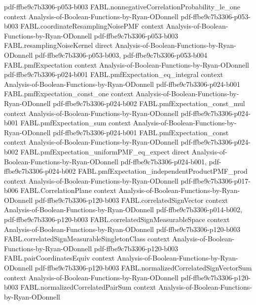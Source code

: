 \begin{theorem}
  {pdf-ffbe9c7b3306-p053-b003}
\proofstep
  {FABL.nonnegativeCorrelationProbability_le_one}
  {context}
  {Analysis-of-Boolean-Functions-by-Ryan-ODonnell}
  {pdf-ffbe9c7b3306-p053-b003}
\proofstep
  {FABL.coordinateResamplingNoisePMF}
  {context}
  {Analysis-of-Boolean-Functions-by-Ryan-ODonnell}
  {pdf-ffbe9c7b3306-p053-b003}
\proofstep
  {FABL.resamplingNoiseKernel}
  {direct}
  {Analysis-of-Boolean-Functions-by-Ryan-ODonnell}
  {pdf-ffbe9c7b3306-p053-b003,
    pdf-ffbe9c7b3306-p053-b004}
\proofstep
  {FABL.pmfExpectation}
  {context}
  {Analysis-of-Boolean-Functions-by-Ryan-ODonnell}
  {pdf-ffbe9c7b3306-p024-b001}
\proofstep
  {FABL.pmfExpectation_eq_integral}
  {context}
  {Analysis-of-Boolean-Functions-by-Ryan-ODonnell}
  {pdf-ffbe9c7b3306-p024-b001}
\proofstep
  {FABL.pmfExpectation_const_one}
  {context}
  {Analysis-of-Boolean-Functions-by-Ryan-ODonnell}
  {pdf-ffbe9c7b3306-p024-b002}
\proofstep
  {FABL.pmfExpectation_const_mul}
  {context}
  {Analysis-of-Boolean-Functions-by-Ryan-ODonnell}
  {pdf-ffbe9c7b3306-p024-b001}
\proofstep
  {FABL.pmfExpectation_sum}
  {context}
  {Analysis-of-Boolean-Functions-by-Ryan-ODonnell}
  {pdf-ffbe9c7b3306-p024-b001}
\proofstep
  {FABL.pmfExpectation_const}
  {context}
  {Analysis-of-Boolean-Functions-by-Ryan-ODonnell}
  {pdf-ffbe9c7b3306-p024-b002}
\proofstep
  {FABL.pmfExpectation_uniformPMF_eq_expect}
  {direct}
  {Analysis-of-Boolean-Functions-by-Ryan-ODonnell}
  {pdf-ffbe9c7b3306-p024-b001,
    pdf-ffbe9c7b3306-p024-b002}
\proofstep
  {FABL.pmfExpectation_independentProductPMF_prod}
  {context}
  {Analysis-of-Boolean-Functions-by-Ryan-ODonnell}
  {pdf-ffbe9c7b3306-p017-b006}
\proofstep
  {FABL.CorrelationPlane}
  {context}
  {Analysis-of-Boolean-Functions-by-Ryan-ODonnell}
  {pdf-ffbe9c7b3306-p120-b003}
\proofstep
  {FABL.correlatedSignVector}
  {context}
  {Analysis-of-Boolean-Functions-by-Ryan-ODonnell}
  {pdf-ffbe9c7b3306-p014-b002,
    pdf-ffbe9c7b3306-p120-b003}
\proofstep
  {FABL.correlatedSignMeasurableSpace}
  {context}
  {Analysis-of-Boolean-Functions-by-Ryan-ODonnell}
  {pdf-ffbe9c7b3306-p120-b003}
\proofstep
  {FABL.correlatedSignMeasurableSingletonClass}
  {context}
  {Analysis-of-Boolean-Functions-by-Ryan-ODonnell}
  {pdf-ffbe9c7b3306-p120-b003}
\proofstep
  {FABL.pairCoordinatesEquiv}
  {context}
  {Analysis-of-Boolean-Functions-by-Ryan-ODonnell}
  {pdf-ffbe9c7b3306-p120-b003}
\proofstep
  {FABL.normalizedCorrelatedSignVectorSum}
  {context}
  {Analysis-of-Boolean-Functions-by-Ryan-ODonnell}
  {pdf-ffbe9c7b3306-p120-b003}
\proofstep
  {FABL.normalizedCorrelatedPairSum}
  {context}
  {Analysis-of-Boolean-Functions-by-Ryan-ODonnell}

\end{theorem}
